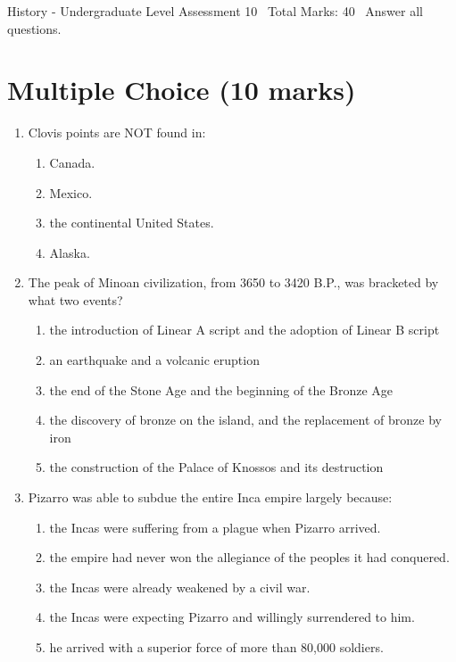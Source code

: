 \documentclass[12pt]{article}
\begin{document}
\begin{center}
History - Undergraduate Level Assessment 10 \
Total Marks: 40 \
Answer all questions.
\end{center}

\section*{Multiple Choice (10 marks)}
\begin{enumerate}[label=\arabic*.]
\item Clovis points are NOT found in:
\begin{enumerate}[label=(\alph*)]
    \item Canada.
    \item Mexico.
    \item the continental United States.
    \item Alaska.
\end{enumerate}
\item The peak of Minoan civilization, from 3650 to 3420 B.P., was bracketed by what two events?
\begin{enumerate}[label=(\alph*)]
    \item the introduction of Linear A script and the adoption of Linear B script
    \item an earthquake and a volcanic eruption
    \item the end of the Stone Age and the beginning of the Bronze Age
    \item the discovery of bronze on the island, and the replacement of bronze by iron
    \item the construction of the Palace of Knossos and its destruction
\end{enumerate}
\item Pizarro was able to subdue the entire Inca empire largely because:
\begin{enumerate}[label=(\alph*)]
    \item the Incas were suffering from a plague when Pizarro arrived.
    \item the empire had never won the allegiance of the peoples it had conquered.
    \item the Incas were already weakened by a civil war.
    \item the Incas were expecting Pizarro and willingly surrendered to him.
    \item he arrived with a superior force of more than 80,000 soldiers.
\end{enumerate}

\end{enumerate}
\end{document}
